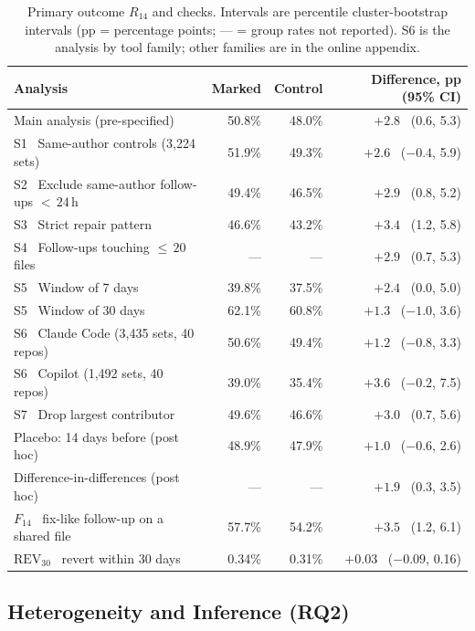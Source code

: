 \documentclass[runningheads]{llncs}
\begin{document}
\begin{table}[!tb]
\caption{Primary outcome $R_{14}$ and checks. Intervals are percentile cluster-bootstrap intervals (pp = percentage points; --- = group rates not reported). S6 is the analysis by tool family; other families are in the online appendix.}\label{tab:primary}
\centering\footnotesize
\setlength{\tabcolsep}{4pt}
\begin{tabular}{@{}lrrr@{}}
\toprule
Analysis & Marked & Control & Difference, pp (95\% CI) \\
\midrule
Main analysis (pre-specified) & 50.8\% & 48.0\% & $+2.8$ \ (0.6, 5.3) \\
\midrule
S1 \ Same-author controls (3,224 sets) & 51.9\% & 49.3\% & $+2.6$ \ ($-0.4$, 5.9) \\
S2 \ Exclude same-author follow-ups ${<}\,24$\,h & 49.4\% & 46.5\% & $+2.9$ \ (0.8, 5.2) \\
S3 \ Strict repair pattern & 46.6\% & 43.2\% & $+3.4$ \ (1.2, 5.8) \\
S4 \ Follow-ups touching ${\le}\,20$ files & --- & --- & $+2.9$ \ (0.7, 5.3) \\
S5 \ Window of 7 days & 39.8\% & 37.5\% & $+2.4$ \ (0.0, 5.0) \\
S5 \ Window of 30 days & 62.1\% & 60.8\% & $+1.3$ \ ($-1.0$, 3.6) \\
S6 \ Claude Code (3,435 sets, 40 repos) & 50.6\% & 49.4\% & $+1.2$ \ ($-0.8$, 3.3) \\
S6 \ Copilot (1,492 sets, 40 repos) & 39.0\% & 35.4\% & $+3.6$ \ ($-0.2$, 7.5) \\
S7 \ Drop largest contributor & 49.6\% & 46.6\% & $+3.0$ \ (0.7, 5.6) \\
\midrule
Placebo: 14 days before (post hoc) & 48.9\% & 47.9\% & $+1.0$ \ ($-0.6$, 2.6) \\
Difference-in-differences (post hoc) & --- & --- & $+1.9$ \ (0.3, 3.5) \\
$F_{14}$ \ fix-like follow-up on a shared file & 57.7\% & 54.2\% & $+3.5$ \ (1.2, 6.1) \\
$\mathrm{REV}_{30}$ \ revert within 30 days & 0.34\% & 0.31\% & $+0.03$ \ ($-0.09$, 0.16) \\
\bottomrule
\end{tabular}
\end{table}

\subsection{Heterogeneity and Inference (RQ2)}\label{sec:hetero}
\end{document}
